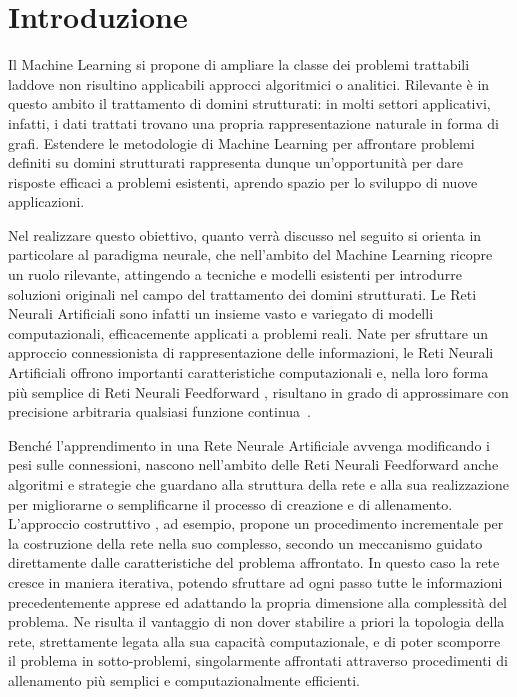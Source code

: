 \chapter{Introduzione}
Il Machine Learning \cite{Mitchell:ML, Hastie:EOSL} si propone di ampliare la classe dei problemi trattabili laddove non risultino applicabili approcci algoritmici o analitici. Rilevante è in questo ambito il trattamento di domini strutturati: in molti settori applicativi, infatti, i dati trattati trovano una propria rappresentazione naturale in forma di grafi. Estendere le metodologie di Machine Learning per affrontare problemi definiti su domini strutturati rappresenta dunque un'opportunità per dare risposte efficaci a problemi esistenti, aprendo spazio per lo sviluppo di nuove applicazioni.

Nel realizzare questo obiettivo, quanto verrà discusso nel seguito si orienta in particolare al paradigma neurale, che nell'ambito del Machine Learning ricopre un ruolo rilevante, attingendo a tecniche e modelli esistenti per introdurre soluzioni originali nel campo del trattamento dei domini strutturati. Le Reti Neurali Artificiali \cite{Haykin:NN,Bishop:NNFPR} sono infatti un insieme vasto e variegato di modelli computazionali, efficacemente applicati a problemi reali. Nate per sfruttare un approccio connessionista di rappresentazione delle informazioni, le Reti Neurali Artificiali offrono importanti caratteristiche computazionali e, nella loro forma più semplice di Reti Neurali Feedforward \cite{Bishop:NNFPR,Haykin:NN}, risultano in grado di approssimare con precisione arbitraria qualsiasi funzione continua~\cite{Cybenko:ApproximationBySuperpositions}.

Benché l'apprendimento in una Rete Neurale Artificiale avvenga modificando i pesi sulle connessioni, nascono nell'ambito delle Reti Neurali Feedforward anche algoritmi e strategie che guardano alla struttura della rete e alla sua realizzazione per migliorarne o semplificarne il processo di creazione e di allenamento. L'approccio costruttivo \cite{Smieja:NeuralNetworkConstructive,Fahlman:CC,Littmann:learningAndGeneralization}, ad esempio, propone un procedimento incrementale per la costruzione della rete nella suo complesso, secondo un meccanismo guidato direttamente dalle caratteristiche del problema affrontato. 
In questo caso la rete cresce in maniera iterativa, potendo sfruttare ad ogni passo tutte le informazioni precedentemente apprese ed adattando la propria dimensione alla complessità del problema. Ne risulta il vantaggio di non dover stabilire a priori la topologia della rete, strettamente legata alla sua capacità computazionale, e di poter scomporre il problema in sotto-problemi, singolarmente affrontati attraverso procedimenti di allenamento più semplici e computazionalmente efficienti.

